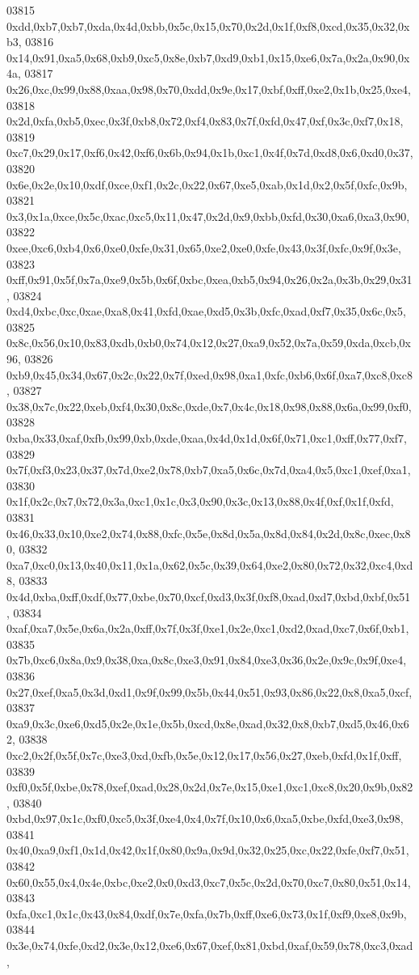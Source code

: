 \begin{DoxyCode}
03815   0xdd,0xb7,0xb7,0xda,0x4d,0xbb,0x5c,0x15,0x70,0x2d,0x1f,0xf8,0xcd,0x35,0x32,0xb3,
03816   0x14,0x91,0xa5,0x68,0xb9,0xc5,0x8e,0xb7,0xd9,0xb1,0x15,0xe6,0x7a,0x2a,0x90,0x4a,
03817   0x26,0xc,0x99,0x88,0xaa,0x98,0x70,0xdd,0x9e,0x17,0xbf,0xff,0xe2,0x1b,0x25,0xe4,
03818   0x2d,0xfa,0xb5,0xec,0x3f,0xb8,0x72,0xf4,0x83,0x7f,0xfd,0x47,0xf,0x3c,0xf7,0x18,
03819   0xc7,0x29,0x17,0xf6,0x42,0xf6,0x6b,0x94,0x1b,0xc1,0x4f,0x7d,0xd8,0x6,0xd0,0x37,
03820   0x6e,0x2e,0x10,0xdf,0xce,0xf1,0x2c,0x22,0x67,0xe5,0xab,0x1d,0x2,0x5f,0xfc,0x9b,
03821   0x3,0x1a,0xce,0x5c,0xac,0xc5,0x11,0x47,0x2d,0x9,0xbb,0xfd,0x30,0xa6,0xa3,0x90,
03822   0xee,0xc6,0xb4,0x6,0xe0,0xfe,0x31,0x65,0xe2,0xe0,0xfe,0x43,0x3f,0xfc,0x9f,0x3e,
03823   0xff,0x91,0x5f,0x7a,0xe9,0x5b,0x6f,0xbc,0xea,0xb5,0x94,0x26,0x2a,0x3b,0x29,0x31,
03824   0xd4,0xbc,0xc,0xae,0xa8,0x41,0xfd,0xae,0xd5,0x3b,0xfc,0xad,0xf7,0x35,0x6c,0x5,
03825   0x8c,0x56,0x10,0x83,0xdb,0xb0,0x74,0x12,0x27,0xa9,0x52,0x7a,0x59,0xda,0xcb,0x96,
03826   0xb9,0x45,0x34,0x67,0x2c,0x22,0x7f,0xed,0x98,0xa1,0xfc,0xb6,0x6f,0xa7,0xc8,0xc8,
03827   0x38,0x7c,0x22,0xeb,0xf4,0x30,0x8c,0xde,0x7,0x4c,0x18,0x98,0x88,0x6a,0x99,0xf0,
03828   0xba,0x33,0xaf,0xfb,0x99,0xb,0xde,0xaa,0x4d,0x1d,0x6f,0x71,0xc1,0xff,0x77,0xf7,
03829   0x7f,0xf3,0x23,0x37,0x7d,0xe2,0x78,0xb7,0xa5,0x6c,0x7d,0xa4,0x5,0xc1,0xef,0xa1,
03830   0x1f,0x2c,0x7,0x72,0x3a,0xc1,0x1c,0x3,0x90,0x3c,0x13,0x88,0x4f,0xf,0x1f,0xfd,
03831   0x46,0x33,0x10,0xe2,0x74,0x88,0xfc,0x5e,0x8d,0x5a,0x8d,0x84,0x2d,0x8c,0xec,0x80,
03832   0xa7,0xc0,0x13,0x40,0x11,0x1a,0x62,0x5c,0x39,0x64,0xe2,0x80,0x72,0x32,0xc4,0xd8,
03833   0x4d,0xba,0xff,0xdf,0x77,0xbe,0x70,0xcf,0xd3,0x3f,0xf8,0xad,0xd7,0xbd,0xbf,0x51,
03834   0xaf,0xa7,0x5e,0x6a,0x2a,0xff,0x7f,0x3f,0xe1,0x2e,0xc1,0xd2,0xad,0xc7,0x6f,0xb1,
03835   0x7b,0xc6,0x8a,0x9,0x38,0xa,0x8c,0xe3,0x91,0x84,0xe3,0x36,0x2e,0x9c,0x9f,0xe4,
03836   0x27,0xef,0xa5,0x3d,0xd1,0x9f,0x99,0x5b,0x44,0x51,0x93,0x86,0x22,0x8,0xa5,0xcf,
03837   0xa9,0x3c,0xe6,0xd5,0x2e,0x1e,0x5b,0xcd,0x8e,0xad,0x32,0x8,0xb7,0xd5,0x46,0x62,
03838   0xc2,0x2f,0x5f,0x7c,0xe3,0xd,0xfb,0x5e,0x12,0x17,0x56,0x27,0xeb,0xfd,0x1f,0xff,
03839   0xf0,0x5f,0xbe,0x78,0xef,0xad,0x28,0x2d,0x7e,0x15,0xe1,0xc1,0xc8,0x20,0x9b,0x82,
03840   0xbd,0x97,0x1c,0xf0,0xc5,0x3f,0xe4,0x4,0x7f,0x10,0x6,0xa5,0xbe,0xfd,0xe3,0x98,
03841   0x40,0xa9,0xf1,0x1d,0x42,0x1f,0x80,0x9a,0x9d,0x32,0x25,0xc,0x22,0xfe,0xf7,0x51,
03842   0x60,0x55,0x4,0x4e,0xbc,0xe2,0x0,0xd3,0xc7,0x5c,0x2d,0x70,0xc7,0x80,0x51,0x14,
03843   0xfa,0xc1,0x1c,0x43,0x84,0xdf,0x7e,0xfa,0x7b,0xff,0xe6,0x73,0x1f,0xf9,0xe8,0x9b,
03844   0x3e,0x74,0xfe,0xd2,0x3e,0x12,0xe6,0x67,0xef,0x81,0xbd,0xaf,0x59,0x78,0xc3,0xad,

\end{DoxyCode}
